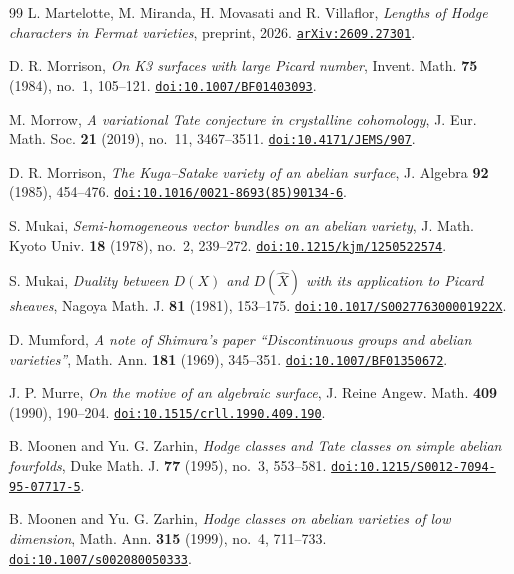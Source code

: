 \begin{thebibliography}{99}
L. Martelotte, M. Miranda, H. Movasati and R. Villaflor,
\emph{Lengths of Hodge characters in Fermat varieties},
preprint, 2026.
\href{https://arxiv.org/abs/2609.27301}{\texttt{arXiv:2609.27301}}.

D. R. Morrison,
\emph{On K3 surfaces with large Picard number},
Invent. Math. \textbf{75} (1984), no.~1, 105--121.
\href{https://doi.org/10.1007/BF01403093}{\texttt{doi:10.1007/BF01403093}}.

M. Morrow,
\emph{A variational Tate conjecture in crystalline cohomology},
J. Eur. Math. Soc. \textbf{21} (2019), no.~11, 3467--3511.
\href{https://doi.org/10.4171/JEMS/907}{\texttt{doi:10.4171/JEMS/907}}.

D. R. Morrison,
\emph{The Kuga--Satake variety of an abelian surface},
J. Algebra \textbf{92} (1985), 454--476.
\href{https://doi.org/10.1016/0021-8693(85)90134-6}%
{\texttt{doi:10.1016/0021-8693(85)90134-6}}.

S. Mukai,
\emph{Semi-homogeneous vector bundles on an abelian variety},
J. Math. Kyoto Univ. \textbf{18} (1978), no.~2, 239--272.
\href{https://doi.org/10.1215/kjm/1250522574}{\texttt{doi:10.1215/kjm/1250522574}}.

S. Mukai,
\emph{Duality between $D(X)$ and $D(\hat{X})$ with its application to Picard
sheaves},
Nagoya Math. J. \textbf{81} (1981), 153--175.
\href{https://doi.org/10.1017/S002776300001922X}{\texttt{doi:10.1017/S002776300001922X}}.

D. Mumford,
\emph{A note of Shimura's paper ``Discontinuous groups and abelian
varieties''},
Math. Ann. \textbf{181} (1969), 345--351.
\href{https://doi.org/10.1007/BF01350672}{\texttt{doi:10.1007/BF01350672}}.

J. P. Murre,
\emph{On the motive of an algebraic surface},
J. Reine Angew. Math. \textbf{409} (1990), 190--204.
\href{https://doi.org/10.1515/crll.1990.409.190}{\texttt{doi:10.1515/crll.1990.409.190}}.

B. Moonen and Yu. G. Zarhin,
\emph{Hodge classes and Tate classes on simple abelian fourfolds},
Duke Math. J. \textbf{77} (1995), no.~3, 553--581.
\href{https://doi.org/10.1215/S0012-7094-95-07717-5}{\texttt{doi:10.1215/S0012-7094-95-07717-5}}.

B. Moonen and Yu. G. Zarhin,
\emph{Hodge classes on abelian varieties of low dimension},
Math. Ann. \textbf{315} (1999), no.~4, 711--733.
\href{https://doi.org/10.1007/s002080050333}{\texttt{doi:10.1007/s002080050333}}.


\end{thebibliography}
